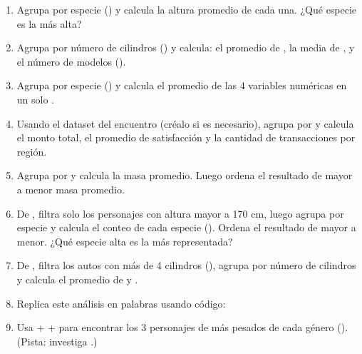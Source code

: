 \documentclass[8pt]{beamer}
\begin{document}
\begin{frame}[fragile]
\begin{enumerate}[start=22]
\item Agrupa  por especie () y calcula la altura promedio de cada una. ¿Qué especie es la más alta?
\item Agrupa  por número de cilindros () y calcula: el promedio de , la media de , y el número de modelos ().
\item Agrupa  por especie () y calcula el promedio de las 4 variables numéricas en un solo .
\item Usando el dataset  del encuentro (créalo si es necesario), agrupa por  y calcula el monto total, el promedio de satisfacción y la cantidad de transacciones por región.
\item Agrupa  por  y calcula la masa promedio. Luego ordena el resultado de mayor a menor masa promedio.
\item De , filtra solo los personajes con altura mayor a 170 cm, luego agrupa por especie y calcula el conteo de cada especie (). Ordena el resultado de mayor a menor. ¿Qué especie alta es la más representada?
\item De , filtra los autos con más de 4 cilindros (), agrupa por número de cilindros y calcula el promedio de  y .
\item Replica este análisis en palabras usando código: \textit{}
\item Usa  +  +  para encontrar los 3 personajes de  más pesados de cada género (). (Pista: investiga .)
\end{enumerate}
\end{frame}
\end{document}

